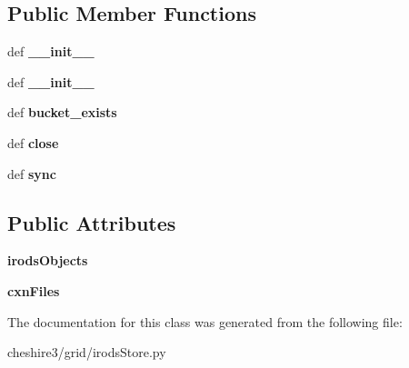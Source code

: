 \subsection*{Public Member Functions}
\begin{DoxyCompactItemize}
\item 
\hypertarget{classcheshire3_1_1grid_1_1irods_store_1_1_irods_switching_bdb_connection_a655a2b4a1812f1dc45b5bb69c97e9bd5}{def {\bfseries \-\_\-\-\_\-init\-\_\-\-\_\-}}\label{classcheshire3_1_1grid_1_1irods_store_1_1_irods_switching_bdb_connection_a655a2b4a1812f1dc45b5bb69c97e9bd5}

\item 
\hypertarget{classcheshire3_1_1grid_1_1irods_store_1_1_irods_switching_bdb_connection_a655a2b4a1812f1dc45b5bb69c97e9bd5}{def {\bfseries \-\_\-\-\_\-init\-\_\-\-\_\-}}\label{classcheshire3_1_1grid_1_1irods_store_1_1_irods_switching_bdb_connection_a655a2b4a1812f1dc45b5bb69c97e9bd5}

\item 
\hypertarget{classcheshire3_1_1grid_1_1irods_store_1_1_irods_switching_bdb_connection_a5e6ad62c2eb7eed4cc5cec095767ea0c}{def {\bfseries bucket\-\_\-exists}}\label{classcheshire3_1_1grid_1_1irods_store_1_1_irods_switching_bdb_connection_a5e6ad62c2eb7eed4cc5cec095767ea0c}

\item 
\hypertarget{classcheshire3_1_1grid_1_1irods_store_1_1_irods_switching_bdb_connection_ab67aa4b113c0427bb2add04c8958e61a}{def {\bfseries close}}\label{classcheshire3_1_1grid_1_1irods_store_1_1_irods_switching_bdb_connection_ab67aa4b113c0427bb2add04c8958e61a}

\item 
\hypertarget{classcheshire3_1_1grid_1_1irods_store_1_1_irods_switching_bdb_connection_a3b8cba4fd051d0e07d8675c68574132a}{def {\bfseries sync}}\label{classcheshire3_1_1grid_1_1irods_store_1_1_irods_switching_bdb_connection_a3b8cba4fd051d0e07d8675c68574132a}

\end{DoxyCompactItemize}
\subsection*{Public Attributes}
\begin{DoxyCompactItemize}
\item 
\hypertarget{classcheshire3_1_1grid_1_1irods_store_1_1_irods_switching_bdb_connection_ad31158811cdca397c8f90cfbf643c2d8}{{\bfseries irods\-Objects}}\label{classcheshire3_1_1grid_1_1irods_store_1_1_irods_switching_bdb_connection_ad31158811cdca397c8f90cfbf643c2d8}

\item 
\hypertarget{classcheshire3_1_1grid_1_1irods_store_1_1_irods_switching_bdb_connection_afb77fb042a82d347fce280df7c60365d}{{\bfseries cxn\-Files}}\label{classcheshire3_1_1grid_1_1irods_store_1_1_irods_switching_bdb_connection_afb77fb042a82d347fce280df7c60365d}

\end{DoxyCompactItemize}


The documentation for this class was generated from the following file\-:\begin{DoxyCompactItemize}
\item 
cheshire3/grid/irods\-Store.\-py\end{DoxyCompactItemize}
